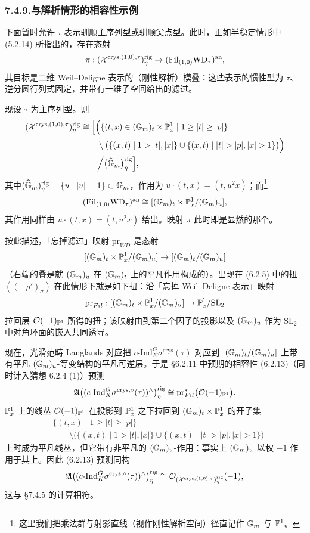 \subsubsection*{7.4.9.\quad 与解析情形的相容性示例}
下面暂时允许 $\tau$ 表示驯顺主序列型或驯顺尖点型。此时，正如半稳定情形中 (5.2.14) 所指出的，存在态射
\[
\pi:(\mathcal{X}^{\mathrm{crys},(1,0),\tau})^{\mathrm{rig}}_\eta\to(\mathrm{Fil}_{(1,0)}\mathrm{WD}_\tau)^{\mathrm{an}},
\]
其目标是二维 Weil--Deligne 表示的（刚性解析）模叠：这些表示的惯性型为 $\tau$、逆分圆行列式固定，并带有一维子空间给出的滤过。

现设 $\tau$ 为主序列型。则
\begin{align*}
(\XX^{\mathrm{crys},(1,0),\tau})^{\mathrm{rig}}_\eta
&\cong\Bigl[\Bigl(\{(t,x)\in(\GG_m)_t\times\PP^{1}_x\mid 1\ge|t|\ge|p|\}\\
&\qquad\setminus\bigl(\{(x,t)\mid 1>|t|,|x|\}\cup\{(x,t)\mid |t|>|p|,|x|>1\}\bigr)\Bigr)\\
&\qquad\Big/\bigl(\wh{\GG}_m\bigr)^{\mathrm{rig}}_\eta\Bigr],
\end{align*}
其中$(\widehat{\mathbb{G}}_m)^{\mathrm{rig}}_\eta=\{u\mid |u|=1\}\subset\mathbb{G}_m$，作用为 $u\cdot(t,x)=(t,u^2x)$；而\footnote{这里我们把乘法群与射影直线（视作刚性解析空间）径直记作 $\mathbb{G}_m$ 与 $\mathbb{P}^{1}$。}
\[
(\mathrm{Fil}_{(1,0)}\mathrm{WD}_\tau)^{\mathrm{an}}\cong[(\mathbb{G}_m)_t\times\mathbb{P}^{1}_x/(\mathbb{G}_m)_u],
\]
其作用同样由 $u\cdot(t,x)=(t,u^2x)$ 给出。映射 $\pi$ 此时即是显然的那个。

按此描述，「忘掉滤过」映射 $\mathrm{pr}_{WD}$ 是态射
\[
[(\mathbb{G}_m)_t\times\mathbb{P}^{1}_x/(\mathbb{G}_m)_u]\to[(\mathbb{G}_m)_t/(\mathbb{G}_m)_u]
\]
（右端的叠是就 $(\mathbb{G}_m)_u$ 在 $(\mathbb{G}_m)_t$ 上的平凡作用构成的）。出现在 (6.2.5) 中的扭 $((-\rho')_\sigma)$ 在此情形下就是如下扭：沿「忘掉 Weil--Deligne 表示」映射
\[
\mathrm{pr}_{Fil}:[(\mathbb{G}_m)_t\times\mathbb{P}^{1}_x/(\mathbb{G}_m)_u]\to\mathbb{P}^{1}_x/\mathrm{SL}_2
\]
拉回层 $\mathcal{O}(-1)_{\mathbb{P}^{1}}$ 所得的扭；该映射由到第二个因子的投影以及 $(\mathbb{G}_m)_u$ 作为 $\mathrm{SL}_2$ 中对角环面的嵌入共同诱导。

现在，光滑范畴 Langlands 对应把 $c\text{-}\mathrm{Ind}_K^G\sigma^{\mathrm{crys}}(\tau)$ 对应到 $[(\mathbb{G}_m)_t/(\mathbb{G}_m)_u]$ 上带有平凡 $(\mathbb{G}_m)_u$-等变结构的平凡可逆层。于是 §6.2.11 中预期的相容性 (6.2.13)（同时计入猜想 6.2.4 (1)）预测
\[
\mathfrak A\bigl((c\text{-}\mathrm{Ind}_K^G\sigma^{\mathrm{crys},\circ}(\tau))^\wedge\bigr)^{\mathrm{rig}}_\eta
\cong\mathrm{pr}_{Fil}^{*}\bigl(\mathcal{O}(-1)_{\mathbb{P}^{1}}\bigr).
\]
$\mathbb{P}^{1}_x$ 上的线丛 $\mathcal{O}(-1)_{\mathbb{P}^{1}}$ 在投影到 $\mathbb{P}^{1}_x$ 之下拉回到 $(\mathbb{G}_m)_t\times\mathbb{P}^{1}_x$ 的开子集
\begin{align*}
&\{(t,x)\mid 1\ge|t|\ge|p|\}\\
&\qquad\setminus\bigl(\{(x,t)\mid 1>|t|,|x|\}\cup\{(x,t)\mid |t|>|p|,|x|>1\}\bigr)
\end{align*}
上时成为平凡线丛，但它带有非平凡的 $(\mathbb{G}_m)_u$-作用：事实上 $(\mathbb{G}_m)_u$ 以权 $-1$ 作用于其上。因此 (6.2.13) 预测同构
\[
\mathfrak A\bigl((c\text{-}\mathrm{Ind}_K^G\sigma^{\mathrm{crys},\circ}(\tau))^\wedge\bigr)^{\mathrm{rig}}_\eta
\cong\mathcal{O}_{(\mathcal{X}^{\mathrm{crys},(1,0),\tau})^{\mathrm{rig}}_\eta}(-1),
\]
这与 §7.4.5 的计算相符。

